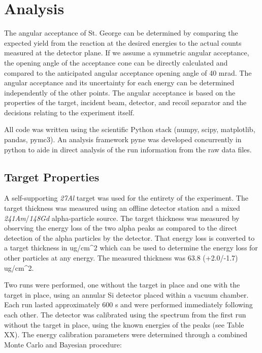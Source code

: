 \chapter{Analysis}\label{analysis}

The angular acceptance of St. George can be determined by comparing the
expected yield from the reaction at the desired energies to the actual
counts measured at the detector plane. If we assume a symmetric angular
acceptance, the opening angle of the acceptance cone can be directly
calculated and compared to the anticipated angular acceptance opening
angle of 40 mrad. The angular acceptance and its uncertainty for each
energy can be determined independently of the other points. The angular
acceptance is based on the properties of the target, incident beam,
detector, and recoil separator and the decisions relating to the
experiment itself.

All code was written using the scientific Python stack (numpy, scipy,
matplotlib, pandas, pymc3). An analysis framework pyne was developed
concurrently in python to aide in direct analysis of the run information
from the raw data files.

\section{Target Properties}\label{target-properties}

A self-supporting \emph{27Al} target was used for the entirety of the
experiment. The target thickness was measured using an offline detector
station and a mixed \emph{241Am}/\emph{148Gd} alpha-particle source. The
target thickness was measured by observing the energy loss of the two
alpha peaks as compared to the direct detection of the alpha particles
by the detector. That energy loss is converted to a target thickness in
ug/cm\^{}2 which can be used to determine the energy loss for other
particles at any energy. The measured thickness was 63.8 (+2.0/-1.7)
ug/cm\^{}2.

Two runs were performed, one without the target in place and one with
the target in place, using an annular Si detector placed within a vacuum
chamber. Each run lasted approximately 600 s and were performed
immediately following each other. The detector was calibrated using the
spectrum from the first run without the target in place, using the known
energies of the peaks (see Table XX). The energy calibration parameters
were determined through a combined Monte Carlo and Bayesian procedure:

